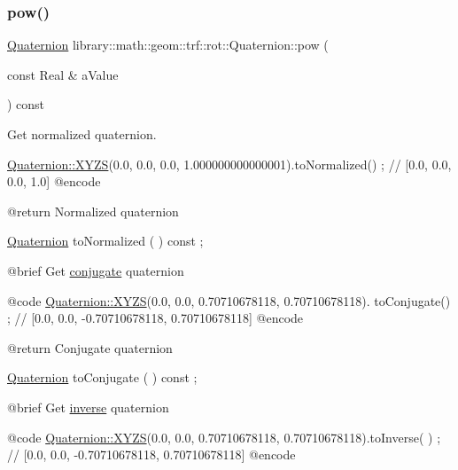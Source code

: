 \subsubsection{\texorpdfstring{pow()}{pow()}}
{\footnotesize\ttfamily \hyperlink{classlibrary_1_1math_1_1geom_1_1trf_1_1rot_1_1_quaternion}{Quaternion} library\+::math\+::geom\+::trf\+::rot\+::\+Quaternion\+::pow (\begin{DoxyParamCaption}\item[{const Real \&}]{a\+Value }\end{DoxyParamCaption}) const}



Get normalized quaternion. 


\begin{DoxyCode}
                        \hyperlink{classlibrary_1_1math_1_1geom_1_1trf_1_1rot_1_1_quaternion_ad6426210c54c79fc5296b5375380a7ca}{Quaternion::XYZS}(0.0, 0.0, 0.0, 1.000000000000001).toNormalized() ;
       \textcolor{comment}{// [0.0, 0.0, 0.0, 1.0]}
    @encode
   
    @\textcolor{keywordflow}{return}             Normalized quaternion

\hyperlink{classlibrary_1_1math_1_1geom_1_1trf_1_1rot_1_1_quaternion_aa7f459a08f5af38b9f7676a6bf36a21c}{Quaternion}              toNormalized                                ( ) \textcolor{keyword}{const} ;

    @brief              Get \hyperlink{classlibrary_1_1math_1_1geom_1_1trf_1_1rot_1_1_quaternion_ab14a6520e55eae7fcb6c2ee144fe8d21}{conjugate} quaternion
   
    @code
                        \hyperlink{classlibrary_1_1math_1_1geom_1_1trf_1_1rot_1_1_quaternion_ad6426210c54c79fc5296b5375380a7ca}{Quaternion::XYZS}(0.0, 0.0, 0.70710678118, 0.70710678118).
      toConjugate() ; \textcolor{comment}{// [0.0, 0.0, -0.70710678118, 0.70710678118]}
    @encode
   
    @\textcolor{keywordflow}{return}             Conjugate quaternion

\hyperlink{classlibrary_1_1math_1_1geom_1_1trf_1_1rot_1_1_quaternion_aa7f459a08f5af38b9f7676a6bf36a21c}{Quaternion}              toConjugate                                 ( ) \textcolor{keyword}{const} ;

    @brief              Get \hyperlink{classlibrary_1_1math_1_1geom_1_1trf_1_1rot_1_1_quaternion_aa9b6ffe2229886b74b36e715ad53c7be}{inverse} quaternion
   
    @code
                        \hyperlink{classlibrary_1_1math_1_1geom_1_1trf_1_1rot_1_1_quaternion_ad6426210c54c79fc5296b5375380a7ca}{Quaternion::XYZS}(0.0, 0.0, 0.70710678118, 0.70710678118).toInverse(
      ) ; \textcolor{comment}{// [0.0, 0.0, -0.70710678118, 0.70710678118]}
    @encode
   

\end{DoxyCode}
